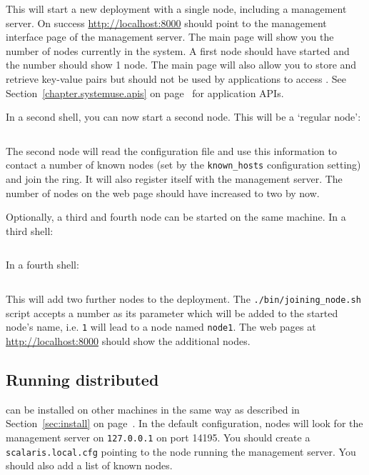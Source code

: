 \documentclass[a4paper]{scrreprt}
\newcommand{\sieheref}[1]{\ref{#1} on page~\pageref{#1}}
\newcommand{\code}[1]{\lstinline[basicstyle=\ttfamily]!#1!}
\begin{document}
This will start a new \scalaris{} deployment with a single node, including a
management server. On success \url{http://localhost:8000} should point to
the management interface page of the management server. The main page will
show you the number of nodes currently in the system.
A first \scalaris{} node should have started and the number should
show 1 node. The main page will also allow you to store and retrieve
key-value pairs but should not be used by applications to access
\scalaris{}. See Section~\sieheref{chapter.systemuse.apis} for application APIs.

In a second shell, you can now start a second \scalaris{} node. This
will be a `regular node':
\begin{lstlisting}[language=sh]
%> ./bin/joining_node.sh
\end{lstlisting}

The second node will read the configuration file and use this information to
contact a number of known nodes (set by the \code{known_hosts} configuration
setting) and join the ring. It will also register itself with the management
server.
The number of nodes on the web page should have increased to two by now.

Optionally, a third and fourth node can be started on the same
machine. In a third shell:
\begin{lstlisting}[language=sh]
%> ./bin/joining_node.sh 2
\end{lstlisting}

In a fourth shell:
\begin{lstlisting}[language=sh]
%> ./bin/joining_node.sh 3
\end{lstlisting}

This will add two further nodes to the deployment. The
\code{./bin/joining_node.sh} script accepts a number as its parameter which
will be added to the started node's name, i.e. \code{1} will lead to a node
named \code{node1}.
The web pages at \url{http://localhost:8000} should show the additional nodes.

\subsection{Running distributed}

\scalaris{} can be installed on other machines in the same way as
described in Section~\sieheref{sec:install}. In the default configuration,
nodes will look for the management server on \code{127.0.0.1} on port 14195. You
should create a \code{scalaris.local.cfg} pointing to the node running
the management server. You should also add a list of known nodes.
\end{document}
